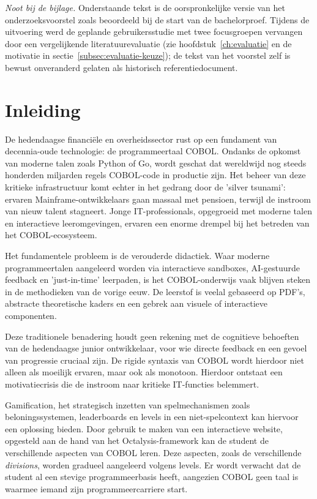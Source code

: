 \noindent\textit{Noot bij de bijlage.} Onderstaande tekst is de oorspronkelijke versie van het onderzoeksvoorstel zoals beoordeeld bij de start van de bachelorproef. Tijdens de uitvoering werd de geplande gebruikersstudie met twee focusgroepen vervangen door een vergelijkende literatuurevaluatie (zie hoofdstuk~\ref{ch:evaluatie} en de motivatie in sectie~\ref{subsec:evaluatie-keuze}); de tekst van het voorstel zelf is bewust onveranderd gelaten als historisch referentiedocument.

\bigskip

\section{Inleiding}%
\label{sec:inleiding}

De hedendaagse financiële en overheidssector rust op een fundament van decennia-oude technologie: de programmeertaal COBOL. 
Ondanks de opkomst van moderne talen zoals Python of Go, wordt geschat dat wereldwijd nog steeds honderden miljarden regels COBOL-code in productie zijn. 
Het beheer van deze kritieke infrastructuur komt echter in het gedrang door de 'silver tsunami': ervaren Mainframe-\allowbreak ontwikkelaars gaan massaal met pensioen, 
terwijl de instroom van nieuw talent stagneert. 
Jonge IT-professionals, opgegroeid met moderne talen en interactieve leeromgevingen, ervaren een enorme drempel bij het betreden van het COBOL-ecosysteem.

Het fundamentele probleem is de verouderde didactiek. 
Waar moderne programmeertalen aangeleerd worden via interactieve sandboxes, AI-gestuurde feedback en 'just-in-time' leerpaden, 
is het COBOL-\allowbreak onderwijs vaak blijven steken in de methodieken van de vorige eeuw. 
De leerstof is veelal gebaseerd op PDF's, abstracte theoretische kaders en een gebrek aan visuele of interactieve componenten.

Deze traditionele benadering houdt geen rekening met de cognitieve behoeften van de hedendaagse junior ontwikkelaar, voor wie directe feedback en een gevoel van progressie cruciaal zijn. 
De rigide syntaxis van COBOL wordt hierdoor niet alleen als moeilijk ervaren, maar ook als monotoon. 
Hierdoor ontstaat een motivatiecrisis die de instroom naar kritieke IT-functies belemmert.

Gamification, het strategisch inzetten van spelmechanismen zoals beloningssystemen, leaderboards en levels in een niet-\allowbreak spelcontext kan hiervoor een oplossing bieden.
Door gebruik te maken van een interactieve website, opgesteld aan de hand van het Octalysis-\allowbreak framework kan de student de verschillende aspecten van COBOL leren. 
Deze aspecten, zoals de verschillende \textit{divisions}, worden gradueel aangeleerd volgens levels.
Er wordt verwacht dat de student al een stevige programmeerbasis heeft, aangezien COBOL geen taal is waarmee iemand zijn programmeercarriere start.


